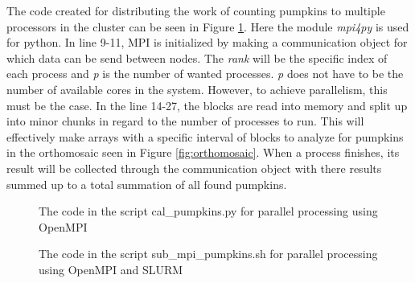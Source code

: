 \documentclass[../Head/Report.tex]{subfiles}
\begin{document}
The code created for distributing the work of counting pumpkins to multiple processors in the cluster can be seen in Figure \ref{fig:cal_pumpkins.py}. Here the module \textit{mpi4py} is used for python. In line 9-11, MPI is initialized  by making a communication object for which data can be send between nodes. The \textit{rank} will be the specific index of each process and \textit{p} is the number of wanted processes. \textit{p} does not have to be the number of available cores in the system. However, to achieve parallelism, this must be the case. In the line 14-27, the blocks are read into memory and split up into minor chunks in regard to the number of processes to run. This will effectively make arrays with a specific interval of blocks to analyze for pumpkins in the orthomosaic seen in Figure \ref{fig:orthomosaic}. When a process finishes, its result will be collected through the communication object with there results summed up to a total summation of all found pumpkins.        


\begin{figure}[H]
\centering
\begin{minipage}{0.9\textwidth}

\end{minipage}
\caption{The code in the script cal\_pumpkins.py for parallel processing using OpenMPI}
\label{fig:cal_pumpkins.py}
\end{figure}

\begin{figure}[H]
\centering
\begin{minipage}{0.9\textwidth}

\end{minipage}
\caption{The code in the script sub\_mpi\_pumpkins.sh for parallel processing using OpenMPI and SLURM}
\label{fig:sub_mpi_pumpkins.sh}
\end{figure}
\end{document}
